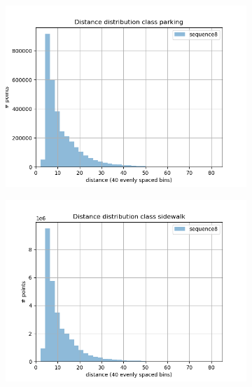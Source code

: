 \begin{figure}[h]
\begin{subfigure}[b]{0.24\textwidth}
         \includegraphics[width=\textwidth]{Figures/Chapter4/dist-height/dist/test/class10.png}
     \end{subfigure}
     \hfill
     \begin{subfigure}[b]{0.24\textwidth}
         \centering
         \includegraphics[width=\textwidth]{Figures/Chapter4/dist-height/dist/test/class11.png}
     \end{subfigure}
     \begin{subfigure}[b]{0.24\textwidth}
         \centering

\end{subfigure}
\end{figure}
